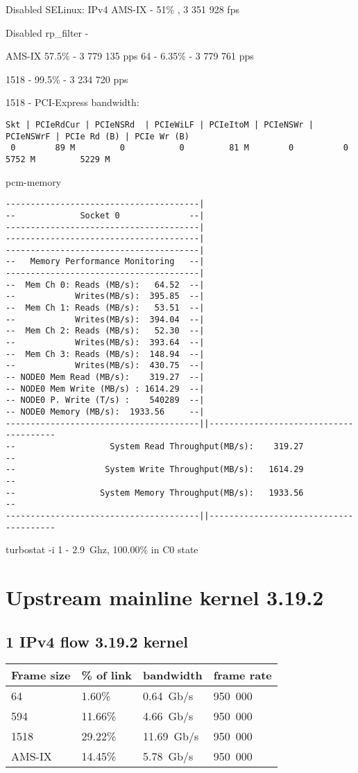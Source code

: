 Disabled SELinux:
IPv4 AMS-IX - 51\% , 3 351 928 fps

Disabled rp\_filter -

AMS-IX 57.5\% - 3 779 135 pps
64 - 6.35\% - 3 779 761 pps

1518 - 99.5\% - 3 234 720 pps

1518 - PCI-Express bandwidth:
\begin{lstlisting}
Skt | PCIeRdCur | PCIeNSRd  | PCIeWiLF | PCIeItoM | PCIeNSWr | PCIeNSWrF | PCIe Rd (B) | PCIe Wr (B)
 0        89 M         0           0         81 M        0          0          5752 M         5229 M
\end{lstlisting}

pcm-memory
\begin{lstlisting}
---------------------------------------|
--             Socket 0              --|
---------------------------------------|
---------------------------------------|
---------------------------------------|
--   Memory Performance Monitoring   --|
---------------------------------------|
--  Mem Ch 0: Reads (MB/s):   64.52  --|
--            Writes(MB/s):  395.85  --|
--  Mem Ch 1: Reads (MB/s):   53.51  --|
--            Writes(MB/s):  394.04  --|
--  Mem Ch 2: Reads (MB/s):   52.30  --|
--            Writes(MB/s):  393.64  --|
--  Mem Ch 3: Reads (MB/s):  148.94  --|
--            Writes(MB/s):  430.75  --|
-- NODE0 Mem Read (MB/s):    319.27  --|
-- NODE0 Mem Write (MB/s) : 1614.29  --|
-- NODE0 P. Write (T/s) :    540289  --|
-- NODE0 Memory (MB/s):  1933.56     --|
---------------------------------------||---------------------------------------
--                   System Read Throughput(MB/s):    319.27                  --
--                  System Write Throughput(MB/s):   1614.29                  --
--                 System Memory Throughput(MB/s):   1933.56                  --
---------------------------------------||---------------------------------------
\end{lstlisting}
turbostat -i 1 - 2.9~Ghz, 100.00\% in C0 state



\section{Upstream mainline kernel 3.19.2}

\subsection{1 IPv4 flow 3.19.2 kernel}
\begin{tabular}{ | l | l | l | l | }
\hline
Frame size & \% of link & bandwidth & frame rate \\
\hline
64     &  1.60\% &  0.64~Gb/s & 950~000 \\ %
594    & 11.66\% &  4.66~Gb/s & 950~000 \\ %
1518   & 29.22\% & 11.69~Gb/s & 950~000 \\ %
AMS-IX & 14.45\% &  5.78~Gb/s & 950~000 \\ %
\hline
\end{tabular}

